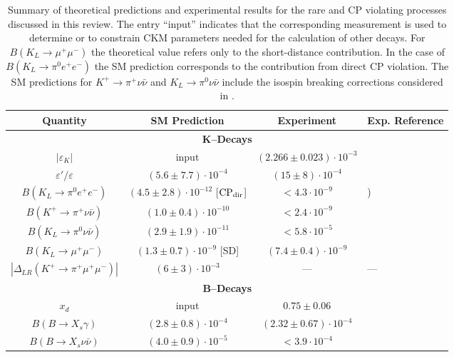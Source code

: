 \begin{table}[htb]
\caption[]{Summary of theoretical predictions and experimental results
for the rare and CP violating processes discussed in this review. The
entry ``input'' indicates that the corresponding measurement is used to
determine or to constrain CKM parameters needed for the calculation of
other decays. For $B(K_L\to\mu^+\mu^-)$ the theoretical value refers
only to the short-distance contribution.  In the case of $B(K_L \to
\pi^0 e^+e^-)$ the SM prediction corresponds to the contribution from
direct CP violation.
The SM predictions for $K^+\to\pi^+\nu\bar\nu$ and
$K_L\to\pi^0\nu\bar\nu$ include the isospin breaking corrections
considered in \cite{marcianoparsa:95}.
\label{tab:sumtab}}
\begin{center}
\begin{tabular}{|c|c|c|l|}
{\bf Quantity}  &  {\bf SM Prediction}  &  {\bf Experiment}  &
\phantom{XXX} {\bf Exp. Reference} \\
\hline \hline
\multicolumn{4}{|c|}{\bf K--Decays}\\
\hline
$|\varepsilon_K|$ & input & $(2.266\pm 0.023)\cdot 10^{-3}$
 & \cite{particledata:94} \\
\hline
$\varepsilon'/\varepsilon$ & $(5.6\pm 7.7)\cdot 10^{-4}$
 & $(15\pm 8)\cdot 10^{-4}$ & \cite{particledata:94} \\
\hline
$B(K_L\to\pi^0e^+e^-)$ & $(4.5 \pm 2.8) \cdot 10^{-12}$
[$\hbox{CP}_{\rm dir}$] & $<4.3\cdot 10^{-9}$
 & \cite{harrisetal:93} )\\
\hline
$B(K^+\to\pi^+\nu\bar\nu)$ & $(1.0\pm 0.4)\cdot 10^{-10}$
 & $<2.4\cdot 10^{-9}$ & \cite{adleretal:95} \\
\hline
$B(K_L\to\pi^0\nu\bar\nu)$ & $(2.9\pm 1.9)\cdot 10^{-11}$
 & $<5.8\cdot 10^{-5}$ & \cite{weaveretal:94} \\
\hline
$B(K_L\to\mu^+\mu^-)$ & $(1.3\pm 0.7)\cdot 10^{-9}$ [SD]
 & $(7.4\pm 0.4)\cdot 10^{-9}$ & \cite{particledata:94} \\
\hline
$|\Delta_{LR}(K^+\to\pi^+\mu^+\mu^-)|$ & $(6\pm 3)\cdot 10^{-3}$
 & --- & ---\\
\hline
\multicolumn{4}{|c|}{\bf B--Decays}\\
\hline
$x_d$ & input & $0.75\pm 0.06$ & \cite{browderhonscheid:95} \\
\hline
$B(B\to X_s\gamma)$ & $(2.8\pm
0.8)\cdot 10^{-4}$
 & $(2.32\pm 0.67)\cdot 10^{-4}$ & \cite{CLEO:94} \\
\hline
$B(B\to X_s\nu\bar\nu)$ & $(4.0\pm 0.9)\cdot 10^{-5}$
 & $< 3.9 \cdot 10^{-4}$ & \cite{grossmanetal:95} \\

\end{tabular}
\end{center}
\end{table}
